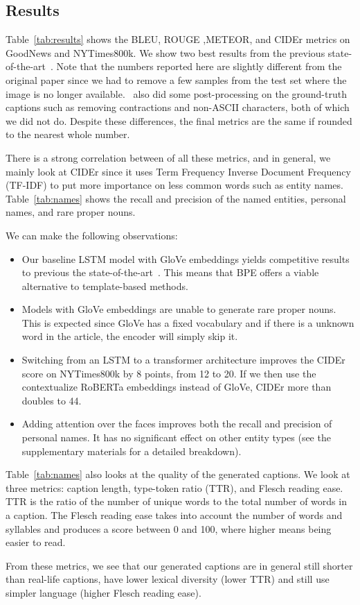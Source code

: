 \subsection{Results}


Table~\ref{tab:results} shows the BLEU, ROUGE
,METEOR, and CIDEr metrics on GoodNews and NYTimes800k. We show two best
results from the previous state-of-the-art~\cite{Biten2019GoodNews}. Note that
the numbers reported here are slightly different from the original paper since
we had to remove a few samples from the test set where the image is no longer
available.~\cite{Biten2019GoodNews} also did some post-processing on the
ground-truth captions such as removing contractions and non-ASCII characters,
both of which we did not do. Despite these differences, the final metrics
are the same if rounded to the nearest whole number.

There is a strong correlation between of all these metrics, and in general, we
mainly look at CIDEr since it uses Term Frequency Inverse Document Frequency
(TF-IDF) to put more importance on less common words such as entity names.
Table~\ref{tab:names} shows the recall and precision of the named entities,
personal names, and rare proper nouns.

We can make the following observations:

\begin{itemize}
   \item Our baseline LSTM model with GloVe embeddings yields competitive
   results to previous the state-of-the-art~\cite{Biten2019GoodNews}. This
   means that BPE offers a viable alternative to template-based methods.

   \item Models with GloVe embeddings are unable to generate rare proper nouns.
   This is expected since GloVe has a fixed vocabulary and if there is a
   unknown word in the article, the encoder will simply skip it.

   \item Switching from an LSTM to a transformer architecture improves the
   CIDEr score on NYTimes800k by 8 points, from 12 to 20. If we then use the
   contextualize RoBERTa embeddings instead of GloVe, CIDEr more than doubles
   to 44.

   \item Adding attention over the faces improves both the recall and precision
   of personal names. It has no significant effect on other entity types (see
   the supplementary materials for a detailed breakdown).
\end{itemize}


Table~\ref{tab:names} also looks at the quality of the generated captions. We
look at three metrics: caption length, type-token ratio (TTR), and Flesch
reading ease. TTR is the ratio of the number of unique words to the total
number of words in a caption. The Flesch reading ease takes into account the
number of words and syllables and produces a score between 0 and 100, where
higher means being easier to read.

From these metrics, we see that our generated captions are in general still
shorter than real-life captions, have lower lexical diversity (lower TTR)
and still use simpler language (higher Flesch reading ease).
